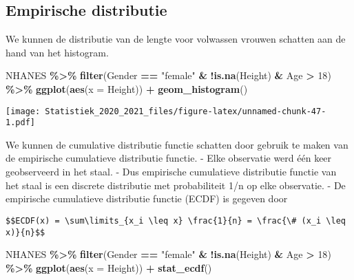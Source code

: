 \documentclass[
  12pt,dutch,coursenotes]{book}
\newenvironment{Shaded}{\begin{snugshade}}{\end{snugshade}}
\newcommand{\DataTypeTok}[1]{\textcolor[rgb]{0.13,0.29,0.53}{#1}}
\newcommand{\DecValTok}[1]{\textcolor[rgb]{0.00,0.00,0.81}{#1}}
\newcommand{\KeywordTok}[1]{\textcolor[rgb]{0.13,0.29,0.53}{\textbf{#1}}}
\newcommand{\NormalTok}[1]{#1}
\newcommand{\OperatorTok}[1]{\textcolor[rgb]{0.81,0.36,0.00}{\textbf{#1}}}
\newcommand{\StringTok}[1]{\textcolor[rgb]{0.31,0.60,0.02}{#1}}
\theoremstyle{definition}
\theoremstyle{definition}
\theoremstyle{definition}
\theoremstyle{remark}
\begin{document}
\hypertarget{empirische-distributie}{%
\subsection{Empirische distributie}\label{empirische-distributie}}

We kunnen de distributie van de lengte voor volwassen vrouwen schatten aan de hand van het histogram.

\begin{Shaded}
\begin{Highlighting}[]
\NormalTok{NHANES }\OperatorTok{\%\textgreater{}\%}\StringTok{ }\KeywordTok{filter}\NormalTok{(Gender }\OperatorTok{==}\StringTok{ "female"} \OperatorTok{\&}\StringTok{ }\OperatorTok{!}\KeywordTok{is.na}\NormalTok{(Height) }\OperatorTok{\&}\StringTok{ }
\StringTok{    }\NormalTok{Age }\OperatorTok{\textgreater{}}\StringTok{ }\DecValTok{18}\NormalTok{) }\OperatorTok{\%\textgreater{}\%}\StringTok{ }\KeywordTok{ggplot}\NormalTok{(}\KeywordTok{aes}\NormalTok{(}\DataTypeTok{x =}\NormalTok{ Height)) }\OperatorTok{+}\StringTok{ }\KeywordTok{geom\_histogram}\NormalTok{()}
\end{Highlighting}
\end{Shaded}

\texttt{[image: Statistiek\_2020\_2021\_files/figure-latex/unnamed-chunk-47-1.pdf]}

We kunnen de cumulative distributie functie schatten door gebruik te maken van de empirische cumulatieve distributie functie.
- Elke observatie werd één keer geobserveerd in het staal.
- Dus empirische cumulatieve distributie functie van het staal is een discrete distributie met probabiliteit 1/n op elke observatie.
- De empirische cumulatieve distributie functie (ECDF) is gegeven door

\begin{verbatim}
$$ECDF(x) = \sum\limits_{x_i \leq x} \frac{1}{n} = \frac{\# (x_i \leq x)}{n}$$
\end{verbatim}

\begin{Shaded}
\begin{Highlighting}[]
\NormalTok{NHANES }\OperatorTok{\%\textgreater{}\%}\StringTok{ }\KeywordTok{filter}\NormalTok{(Gender }\OperatorTok{==}\StringTok{ "female"} \OperatorTok{\&}\StringTok{ }\OperatorTok{!}\KeywordTok{is.na}\NormalTok{(Height) }\OperatorTok{\&}\StringTok{ }
\StringTok{    }\NormalTok{Age }\OperatorTok{\textgreater{}}\StringTok{ }\DecValTok{18}\NormalTok{) }\OperatorTok{\%\textgreater{}\%}\StringTok{ }\KeywordTok{ggplot}\NormalTok{(}\KeywordTok{aes}\NormalTok{(}\DataTypeTok{x =}\NormalTok{ Height)) }\OperatorTok{+}\StringTok{ }\KeywordTok{stat\_ecdf}\NormalTok{()}
\end{Highlighting}
\end{Shaded}
\end{document}
